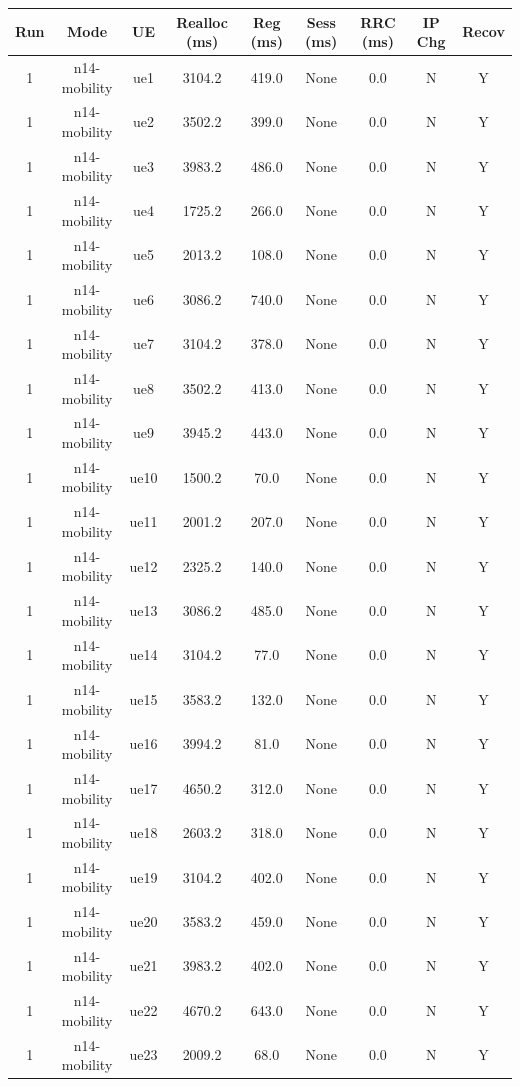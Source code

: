 \begin{table}[ht]
\centering
\begin{tabular}{|c|c|c|c|c|c|c|c|c|}
\hline
Run & Mode & UE & Realloc (ms) & Reg (ms) & Sess (ms) & RRC (ms) & IP Chg & Recov \\
\hline
1 & n14-mobility & ue1 & 3104.2 & 419.0 & None & 0.0 & N & Y \\
1 & n14-mobility & ue2 & 3502.2 & 399.0 & None & 0.0 & N & Y \\
1 & n14-mobility & ue3 & 3983.2 & 486.0 & None & 0.0 & N & Y \\
1 & n14-mobility & ue4 & 1725.2 & 266.0 & None & 0.0 & N & Y \\
1 & n14-mobility & ue5 & 2013.2 & 108.0 & None & 0.0 & N & Y \\
1 & n14-mobility & ue6 & 3086.2 & 740.0 & None & 0.0 & N & Y \\
1 & n14-mobility & ue7 & 3104.2 & 378.0 & None & 0.0 & N & Y \\
1 & n14-mobility & ue8 & 3502.2 & 413.0 & None & 0.0 & N & Y \\
1 & n14-mobility & ue9 & 3945.2 & 443.0 & None & 0.0 & N & Y \\
1 & n14-mobility & ue10 & 1500.2 & 70.0 & None & 0.0 & N & Y \\
1 & n14-mobility & ue11 & 2001.2 & 207.0 & None & 0.0 & N & Y \\
1 & n14-mobility & ue12 & 2325.2 & 140.0 & None & 0.0 & N & Y \\
1 & n14-mobility & ue13 & 3086.2 & 485.0 & None & 0.0 & N & Y \\
1 & n14-mobility & ue14 & 3104.2 & 77.0 & None & 0.0 & N & Y \\
1 & n14-mobility & ue15 & 3583.2 & 132.0 & None & 0.0 & N & Y \\
1 & n14-mobility & ue16 & 3994.2 & 81.0 & None & 0.0 & N & Y \\
1 & n14-mobility & ue17 & 4650.2 & 312.0 & None & 0.0 & N & Y \\
1 & n14-mobility & ue18 & 2603.2 & 318.0 & None & 0.0 & N & Y \\
1 & n14-mobility & ue19 & 3104.2 & 402.0 & None & 0.0 & N & Y \\
1 & n14-mobility & ue20 & 3583.2 & 459.0 & None & 0.0 & N & Y \\
1 & n14-mobility & ue21 & 3983.2 & 402.0 & None & 0.0 & N & Y \\
1 & n14-mobility & ue22 & 4670.2 & 643.0 & None & 0.0 & N & Y \\
1 & n14-mobility & ue23 & 2009.2 & 68.0 & None & 0.0 & N & Y \\

\end{tabular}
\end{table}
